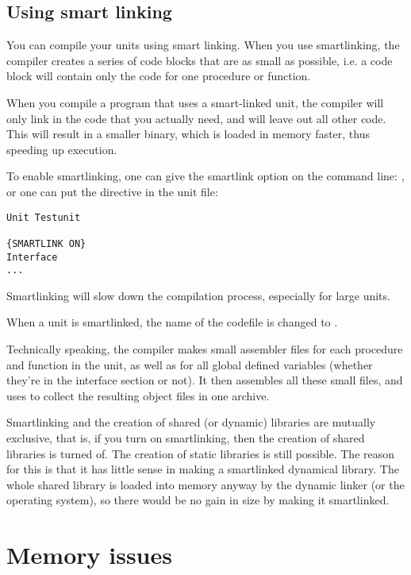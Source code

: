 \section{Using smart linking}
\label{se:SmartLinking}

You can compile your units using smart linking. When you use smartlinking,
the compiler creates a series of code blocks that are as small as possible,
i.e. a code block will contain only the code for one procedure or function.

When you compile a program that uses a smart-linked unit, the compiler will
only link in the code that you actually need, and will leave out all other
code. This will result in a smaller binary, which is loaded in memory
faster, thus speeding up execution.

To enable smartlinking, one can give the smartlink option on the command
line: , or one can put the  directive in
the unit file:
\begin{verbatim}
Unit Testunit

{SMARTLINK ON}
Interface
...
\end{verbatim}
Smartlinking will slow down the compilation process, especially for large
units.

When a unit  is smartlinked, the name of the codefile is
changed to .

Technically speaking, the compiler makes small assembler files for each
procedure and function in the unit, as well as for all global defined
variables (whether they're in the interface section or not). It then
assembles all these small files, and uses  to collect the resulting
object files in one archive.

Smartlinking and the creation of shared (or dynamic) libraries are mutually
exclusive, that is, if you turn on smartlinking, then the creation of shared
libraries is turned of. The creation of static libraries is still possible.
The reason for this is that it has little sense in making a smartlinked
dynamical library. The whole shared library is loaded into memory anyway by
the dynamic linker (or the operating system), so there would be no gain in size by
making it smartlinked.




\chapter{Memory issues}
\label{ch:Memory}

